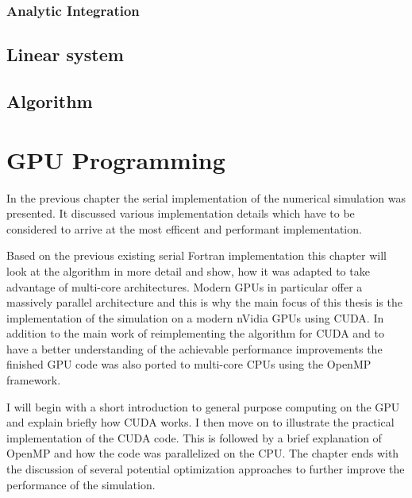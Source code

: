 \documentclass[a4paper,11pt]{kth-mag}
\begin{document}
\subsection{Analytic Integration}
\section{Linear system}

\section{Algorithm}

\chapter{GPU Programming}
In the previous chapter the serial implementation of the numerical simulation was presented. It discussed various implementation details which have to be considered to arrive at the most efficent and performant implementation.

Based on the previous existing serial Fortran implementation this chapter will look at the algorithm in more detail and show, how it was adapted to take advantage of multi-core architectures. Modern GPUs in particular offer a massively parallel architecture and this is why the main focus of this thesis is the implementation of the simulation on a modern nVidia GPUs using CUDA. In addition to the main work of reimplementing the algorithm for CUDA and to have a better understanding of the achievable performance improvements the finished GPU code was also ported to multi-core CPUs using the OpenMP framework.

I will begin with a short introduction to general purpose computing on the GPU and explain briefly how CUDA works. I then move on to illustrate the practical implementation of the CUDA code. This is followed by a brief explanation of OpenMP and how the code was parallelized on the CPU. The chapter ends with the discussion of several potential optimization approaches to further improve the performance of the simulation.
\end{document}
